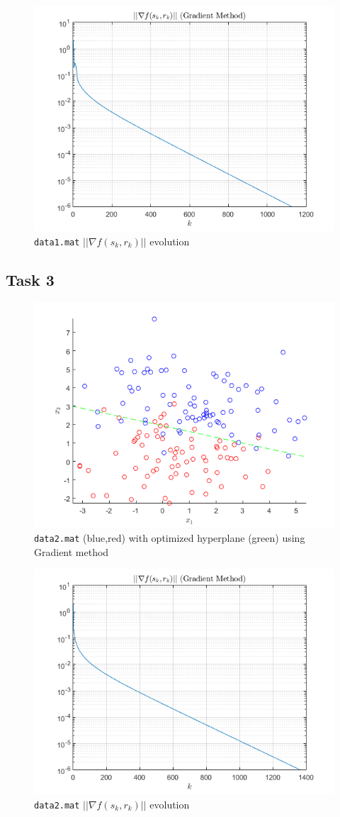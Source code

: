 \begin{figure}[!htb]
		\centering
		\includegraphics[width=0.5\linewidth]{part2/figures/T2_Norm.png}
		\caption{\texttt{data1.mat} $||\nabla{f(s_k,r_k)}||$ evolution}\label{pt2task2:Norm}	
\end{figure}
    
\subsection{Task 3}

\begin{figure}[H]
	\centering
	\includegraphics[width=0.5\linewidth]{part2/figures/T3_Line.png}
	\caption{\texttt{data2.mat} (blue,red) with optimized hyperplane (green) using Gradient method}\label{task3:graph}		
\end{figure}

\begin{figure}[!htb]
		\centering
		\includegraphics[width=0.5\linewidth]{part2/figures/T3_Norm.png}
		\caption{\texttt{data2.mat} $||\nabla{f(s_k,r_k)}||$ evolution}\label{fig:pt2task3:Norm}	
\end{figure}

